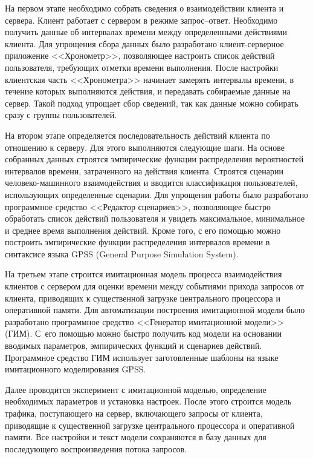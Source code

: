 \begin{multicols}{2}
  На первом этапе необходимо собрать сведения о взаимодействии клиента и 
сервера. Клиент работает с сервером в режиме за\-прос--от\-вет. Необходимо 
получить данные об интервалах времени между определенными действиями 
клиента. Для упрощения сбора данных было разработано клиент-серверное 
приложение <<Хронометр>>, позволяющее настроить список действий 
пользователя, требующих отметки времени выполнения. После настройки 
клиентская часть <<Хронометра>> начинает замерять интервалы времени, в 
течение которых выполняются действия, и передавать собираемые данные на 
сервер. Такой подход упрощает сбор сведений, так как данные можно собирать 
сразу с группы пользователей.
  
  На втором этапе определяется последовательность действий клиента по 
отношению к серверу. Для этого выполняются следующие шаги. На основе 
собранных данных строятся эмпирические функции распределения вероятностей 
интервалов времени, затраченного на действия клиента. Строятся сценарии 
  че\-ло\-ве\-ко-ма\-шин\-но\-го взаимодействия и вводится классификация 
пользователей, использующих определенные сценарии. Для упрощения работы 
было разработано программное средство <<Редактор сценариев>>, позволяющее 
быстро обработать список действий пользователя и увидеть максимальное, 
минимальное и среднее время выполнения действий. Кроме того, с его помощью 
можно построить эмпирические функции распределения интервалов времени в 
синтаксисе языка {GPSS} (General Purpose Simulation System).
  
  На третьем этапе строится имитационная модель процесса взаимодействия 
клиентов с сервером для оценки времени между событиями прихода запросов от 
клиента, приводящих к существенной загрузке центрального процессора и 
оперативной памяти. Для автоматизации построения имитационной модели было 
разработано программное средство <<Генератор имитационной модели>> (ГИМ). 
С~его помощью можно быстро получить код модели на основании вводимых 
параметров, эмпирических функций и сценариев действий. Программное средство ГИМ использует 
заготовленные шаблоны на языке имитационного моделирования {GPSS}.
  
  Далее проводится эксперимент с имитационной моделью, определение 
необходимых параметров и установка настроек. После этого строится модель 
трафика, поступающего на сервер, включающего запросы от клиента, приводящие 
к существенной загрузке центрального процессора и оперативной памяти. Все 
настройки и текст модели сохраняются в базу данных для последующего 
воспроизведения потока запросов.
  

\end{multicols}
